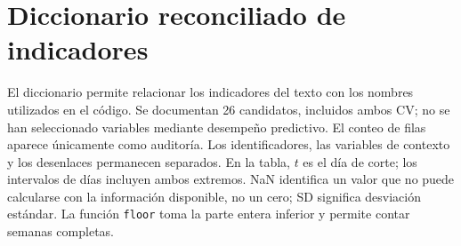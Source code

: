 \section{Diccionario reconciliado de indicadores}\label{corr:anexodiccionario}
El diccionario permite relacionar los indicadores del texto con los nombres utilizados en el código. Se documentan 26 candidatos, incluidos ambos CV; no se han seleccionado variables mediante desempeño predictivo. El conteo de filas aparece únicamente como auditoría. Los identificadores, las variables de contexto y los desenlaces permanecen separados. En la tabla, $t$ es el día de corte; los intervalos de días incluyen ambos extremos. NaN identifica un valor que no puede calcularse con la información disponible, no un cero; SD significa desviación estándar. La función \texttt{floor} toma la parte entera inferior y permite contar semanas completas.
\begingroup\small\setlength{\tabcolsep}{3pt}\renewcommand{\arraystretch}{1.16}
